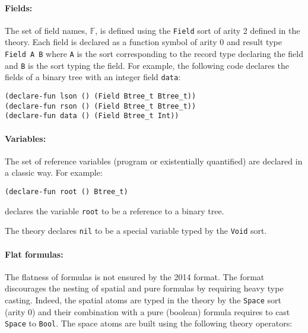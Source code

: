 \documentclass{llncs}
\newcommand{\pfields}{\mathbb{F}}
\begin{document}
\paragraph{Fields:} The set of field names, $\pfields$, is defined using the \texttt{Field} sort of arity 2 defined in the theory.
Each field is declared as a function symbol of arity 0 and result type \texttt{Field A B} where \texttt{A} is the sort corresponding to the record type declaring the field and 
\texttt{B} is the sort typing the field.
For example, the following code declares the fields of a binary tree with an integer field \texttt{data}:
\begin{verbatim}
(declare-fun lson () (Field Btree_t Btree_t))
(declare-fun rson () (Field Btree_t Btree_t))
(declare-fun data () (Field Btree_t Int))
\end{verbatim}


\paragraph{Variables:} The set of reference variables (program or existentially quantified) are declared in a classic way.
For example:
\begin{verbatim}
(declare-fun root () Btree_t)
\end{verbatim}
declares the variable \texttt{root} to be a reference to a binary tree.

The theory declares \texttt{nil} to be a special variable typed by the \texttt{Void} sort.

\paragraph{Flat formulas:}
The flatness of formulas is not ensured by the 2014 format. 
The format discourages the nesting of spatial and pure formulas by requiring heavy type casting.
Indeed, the spatial atoms are typed in the theory by the \texttt{Space} sort (arity 0) and their combination with a pure (boolean) formula requires to cast \texttt{Space} to \texttt{Bool}.
The space atoms are built using the following theory operators:
\end{document}
